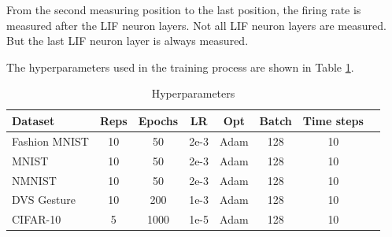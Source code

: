     From the second measuring position to the last position, the firing rate is measured after the LIF neuron layers. Not all LIF neuron layers are measured. But the last LIF neuron layer is always measured. 

    The hyperparameters used in the training process are shown in Table \ref{tab:hyperparameters_firerate}.

    \begin{table}
        \begin{tabularx}{\textwidth}{|X|c|c|c|c|c|c|c|}
            \toprule
            Dataset & Reps & Epochs & LR & Opt & Batch & Time steps \\
            \midrule
            Fashion MNIST & 10 & 50 & 2e-3 & Adam & 128 & 10 \\
            MNIST & 10 & 50 & 2e-3 & Adam & 128 & 10 \\
            NMNIST & 10 & 50 & 2e-3 & Adam & 128 & 10 \\
            DVS Gesture & 10 & 200 & 1e-3 & Adam & 128 & 10 \\
            CIFAR-10 & 5 & 1000 & 1e-5 & Adam & 128 & 10 \\
            \bottomrule
        \end{tabularx}
        \caption{Hyperparameters}
        \label{tab:hyperparameters_firerate}
    \end{table}

